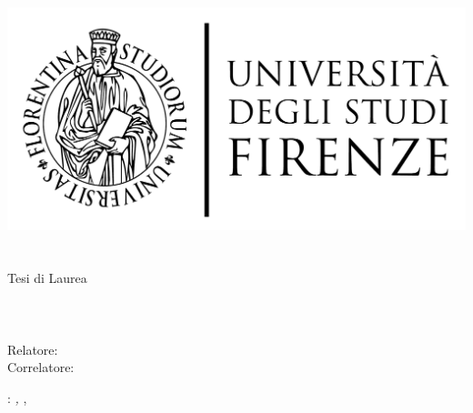 \begin{titlepage}
	\begin{center}
   	\large
      \hfill
      \vfill
      \begingroup
         \includegraphics[scale=0.15]{logo/LOGO}\\
			\myFaculty \\
			\myDegree \\
			\vspace{0.5cm}
         \vspace{0.5cm}
         Tesi di Laurea
      \endgroup
      \vfill
      \vfill
      \begingroup
      	\color{Maroon}\spacedallcaps{\myItalianTitle} \\ $\ $\\ \spacedallcaps{\myEnglishTitle} \\ $\ $\\
	\bigskip
      \endgroup
      \vfill
      \vfill
            \spacedlowsmallcaps{\myName}
      \vfill
      \vfill
      Relatore: \emph{\myProf}\\
      Correlatore: \emph{\myOtherProf}\\
      \vfill
      \vfill
      \vfill
      \vfill
      \myTime
      \vfill
	\end{center}
\end{titlepage}
   \newpage
	\thispagestyle{empty}
	\hfill
	\vfill
	\noindent\myName:
	\textit{\myItalianTitle,}
	\myDegree, \textcopyright\ \myTime

